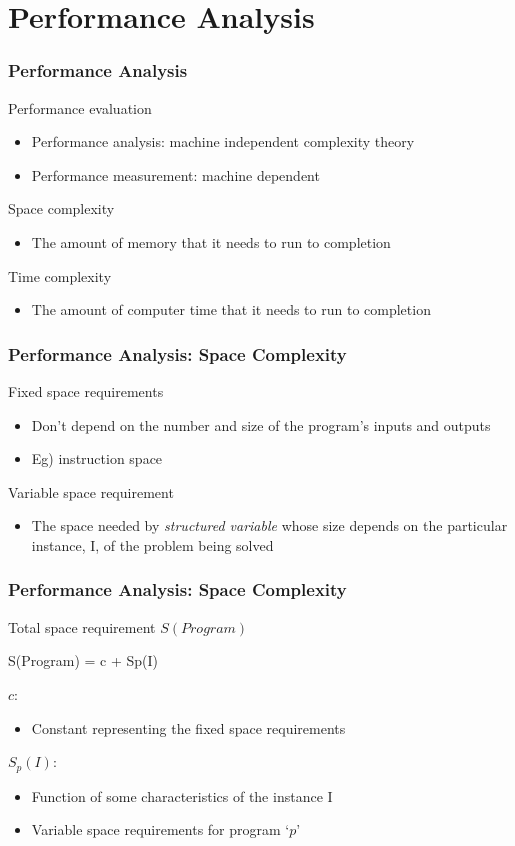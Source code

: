 \documentclass[newPxFont,sthlmFooter,nooffset]{beamer}
\begin{document}
\section{Performance Analysis}
\begin{frame}[t]
  \frametitle{Performance Analysis}
Performance evaluation 
\begin{itemize}
\item Performance analysis: machine independent complexity theory 
\item Performance measurement: machine dependent
\end{itemize}

Space complexity
\begin{itemize}
\item The amount of memory that it needs to run to completion
\end{itemize}

Time complexity
\begin{itemize}
\item The amount of computer time that it needs to run to completion
\end{itemize}

\end{frame}

\begin{frame}[t]
  \frametitle{Performance Analysis: Space Complexity}
Fixed space requirements
\begin{itemize}
\item Don’t depend on the number and size of the program’s inputs and outputs
\item Eg) instruction space
\end{itemize}

Variable space requirement
\begin{itemize}
\item The space needed by \textit{structured variable} whose size depends on
  the particular instance, I, of the problem being solved
\end{itemize}

\end{frame}

\begin{frame}[t, fragile]
  \frametitle{Performance Analysis: Space Complexity}
Total space requirement $S(Program)$
\begin{codedef}
  S(Program) = c + Sp(I)
\end{codedef}
\textbf{$c$}:
\begin{itemize}
\item Constant representing the fixed space requirements
\end{itemize}
\textbf{$S_{p}(I)$}:
\begin{itemize}
	\item Function of some characteristics of the instance I
	\item Variable space requirements for program `$p$'
\end{itemize}
\end{frame}
\end{document}
